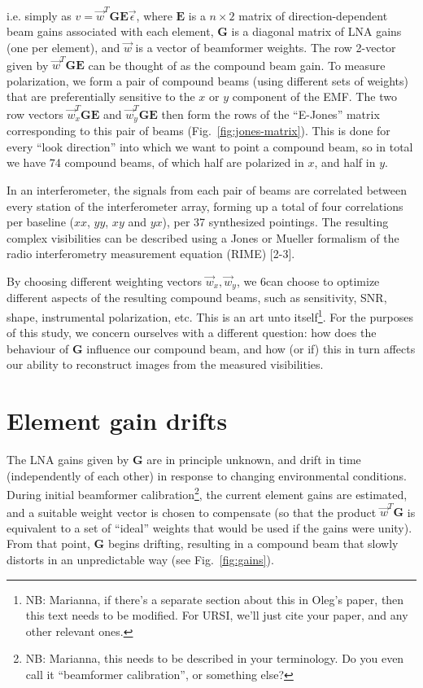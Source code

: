 \documentclass{aps2010} \special{papersize=8.5in,11in}
\begin{document}
i.e. simply as $v=\vec w^T \mathbf{G} \mathbf{E} \vec\epsilon$, where $\mathbf{E}$ is a $n\times2$ matrix of direction-dependent beam gains associated with each element, $\mathbf{G}$ is a diagonal matrix of LNA gains (one per element), and $\vec w$ is a vector of beamformer weights. The row 2-vector given by $\vec w^T \mathbf{G} \mathbf{E}$ can be thought of as the compound beam gain. To measure polarization, we form a pair of compound beams (using different sets of weights) that are preferentially sensitive to the $x$ or $y$ component of the EMF. The two row vectors $\vec w_x^T \mathbf{G} \mathbf{E}$ and $\vec w_y^T \mathbf{G} \mathbf{E}$ then form the rows of the ``E-Jones'' matrix corresponding to this pair of beams (Fig.~\ref{fig:jones-matrix}). This is done for every ``look direction'' into which we want to point a compound beam, so in total we have 74 compound beams, of which half are polarized in $x$, and half in $y$.

In an interferometer, the signals from each pair of beams are correlated between every station of the interferometer array, forming up a total of four correlations per baseline ($xx$, $yy$, $xy$ and $yx$), per 37 synthesized pointings. The resulting complex visibilities can be described using a Jones or Mueller formalism of the radio interferometry measurement equation (RIME) [2-3].

By choosing different weighting vectors $\vec w_x,\vec w_y$, we 6can choose to optimize different aspects of the resulting compound beams, such as sensitivity, SNR, shape, instrumental polarization, etc. This is an art unto itself\footnote{NB: Marianna, if there's a separate section about this in Oleg's paper, then this text needs to be modified. For URSI, we'll just cite your paper, and any other relevant ones.}. For the purposes of this study, we concern ourselves with a different question: how does the behaviour of $\mathbf{G}$ influence our compound beam, and how (or if) this in turn affects our ability to reconstruct images from the measured visibilities.

\section{Element gain drifts}

The LNA gains given by $\mathbf{G}$ are in principle unknown, and drift in time (independently of each other) in response to changing environmental conditions. During initial beamformer calibration\footnote{NB: Marianna, this needs to be described in your terminology. Do you even call it ``beamformer calibration'', or something else?}, the current element gains are estimated, and a suitable weight vector is chosen to compensate (so that the product $\vec w^T\mathbf{G}$ is equivalent to a set of ``ideal'' weights that would be used if the gains were unity). From that point, $\mathbf{G}$ begins drifting, resulting in a compound beam that slowly distorts in an unpredictable way (see Fig.~\ref{fig:gains}). 
\end{document}
